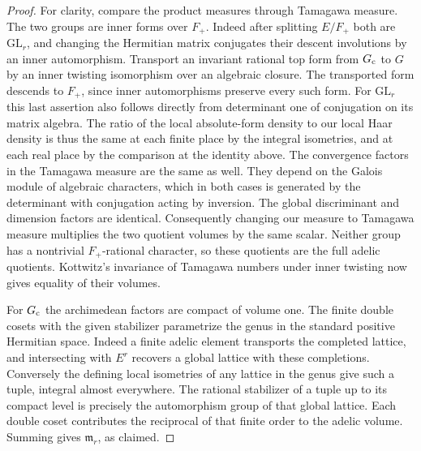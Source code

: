 \documentclass[a4paper,11pt]{article}
\theoremstyle{definition}
\theoremstyle{remark}
\numberwithin{equation}{section}
\begin{document}
\begin{proof}
For clarity, compare the product measures through Tamagawa
measure. The two groups are inner forms over \(F_+\). Indeed
after splitting \(E/F_+\) both are \(\mathrm{GL}_r\), and
changing the Hermitian matrix conjugates their descent
involutions by an inner automorphism. Transport an invariant
rational top form from \(G_{\rm c}\) to \(G\) by an inner
twisting isomorphism over an algebraic closure. The transported
form descends to \(F_+\), since inner automorphisms preserve
every such form. For \(\mathrm{GL}_r\) this last assertion
also follows directly from determinant one of conjugation on
its matrix algebra. The ratio of the local absolute-form
density to our local Haar density is thus the same at each
finite place by the integral isometries, and at each real
place by the comparison at the identity above. The convergence
factors in the Tamagawa measure are the same as well. They
depend on the Galois module of algebraic characters, which in
both cases is generated by the determinant with conjugation
acting by inversion. The global discriminant and dimension
factors are identical. Consequently changing our measure to
Tamagawa measure multiplies the two quotient volumes by the
same scalar. Neither group has a nontrivial \(F_+\)-rational
character, so these quotients are the full adelic quotients.
Kottwitz's invariance of Tamagawa numbers under inner twisting
now gives equality of their volumes.~\cite{XVIII-XIII-I-kott91}

For \(G_{\rm c}\) the archimedean factors are compact of
volume one. The finite double cosets with the given stabilizer
parametrize the genus in the standard positive Hermitian space.
Indeed a finite adelic element transports the completed lattice,
and intersecting with \(E^r\) recovers a global lattice with
these completions. Conversely the defining local isometries
of any lattice in the genus give such a tuple, integral almost
everywhere. The rational stabilizer of a tuple up to its compact
level is precisely the automorphism group of that global lattice.
Each double coset contributes the reciprocal of that finite order
to the adelic volume. Summing gives \(\mathfrak m_r\), as claimed.


\end{proof}
\end{document}
